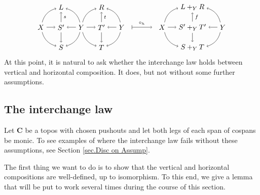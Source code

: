 \documentclass{tac}
\newcommand{\cat}[1]{\mathbf{#1}}
\begin{document}
\[
	\begin{tikzpicture}
	\node (X) at (-5,0) {$X$};
	\node (Y) at (-3,0) {$Y$};
	\node (Z) at (-1,0) {$Y$};
	\node (L) at (-4,1) {$L$};
	\node (S') at (-4,0) {$S'$};
	\node (S) at (-4,-1) {$S$};
	\node (R) at (-2,1) {$R$};
	\node (T') at (-2,0) {$T'$};
	\node (T) at (-2,-1) {$T$};
	\draw [->] (X) edge[bend left=30] (L);
	\draw [->] (X) edge (S');
	\draw [->] (X) edge[bend right=30] (S);
	\draw [->] (Y) edge[bend right=30] (L);
	\draw [->] (Y) edge (S');
	\draw [->] (Y) edge[bend left=30] (S);
	\draw [->] (Y) edge[bend left=30] (R);
	\draw [->] (Y) edge (T');
	\draw [->] (Y) edge[bend right=30] (T);
	\draw [->] (Z) edge[bend right=30] (R);
	\draw [->] (Z) edge (T');
	\draw [->] (Z) edge[bend left=30] (T);
	\draw [font=\scriptsize,->] (S') edge node[right] {$s$} (L);
	\draw [->] (S') edge (S);
	\draw [font=\scriptsize,->] (T') edge node[right] {$t$} (R);
	\draw [->] (T') edge (T);
	\draw [font=\scriptsize,|->] (-0.5,0) -- node[above] {$\circ_h$} (0.5,0);
	\node (X) at (1,0) {$X$};
	\node (Y) at (4,0) {$Y$};
	\node (L) at (2.5,1) {$L+_YR$};
	\node (L') at (2.5,-1) {$S+_YT$};
	\node (Spb) at (2.5,0) {$S'+_YT'$};
	\draw [->] (X) edge[bend left=30] (L);
	\draw [->] (X) edge[] (Spb);
	\draw [->] (X) edge[bend right=30] (L');
	\draw [->] (Y) edge[bend right=30] (L);
	\draw [->] (Y) edge[] (Spb);
	\draw [->] (Y) edge[bend left=30] (L');
	\draw [font=\scriptsize,->] (Spb) edge node[right] {$f$} (L);
	\draw [->] (Spb) edge[] (L');
	\end{tikzpicture}
\]
At this point, it is natural to ask whether 
the interchange law holds between 
vertical and horizontal composition. 
It does, but not without some further assumptions. 


\subsection{The interchange law}

Let $\cat{C}$ be a topos with 
chosen pushouts and let both 
legs of each span of cospans be monic. 
To see examples of where the interchange law fails 
without these assumptions, see Section 
	\ref{sec.Disc on Assump}.

The first thing we want to do is to show 
that the vertical and horizontal compositions 
are well-defined, up to isomorphism. 
To this end, we give a lemma that will be 
put to work several times during the course of this section.
\end{document}
